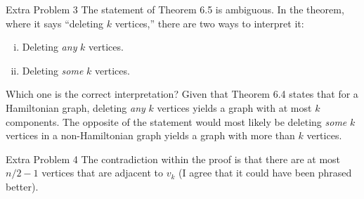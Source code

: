 \documentclass[10pt]{extarticle}
\begin{document}
  \begin{problem}{Extra Problem 3}
    The statement of Theorem 6.5 is ambiguous. In the theorem, where it says ``deleting $k$ vertices,'' there are two ways to interpret it:
    \begin{enumerate}[(i)]
      \item Deleting \textit{any} $k$ vertices.
      \item Deleting \textit{some} $k$ vertices.
    \end{enumerate}
    Which one is the correct interpretation?
    \tcblower
    Given that Theorem 6.4 states that for a Hamiltonian graph, deleting \textit{any} $k$ vertices yields a graph with at most $k$ components. The opposite of the statement would most likely be deleting \textit{some} $k$ vertices in a non-Hamiltonian graph yields a graph with more than $k$ vertices.
  \end{problem}
  \begin{problem}{Extra Problem 4}
    The contradiction within the proof is that there are at most $n/2-1$ vertices that are adjacent to $v_k$ (I agree that it could have been phrased better).
  \end{problem}
\end{document}
